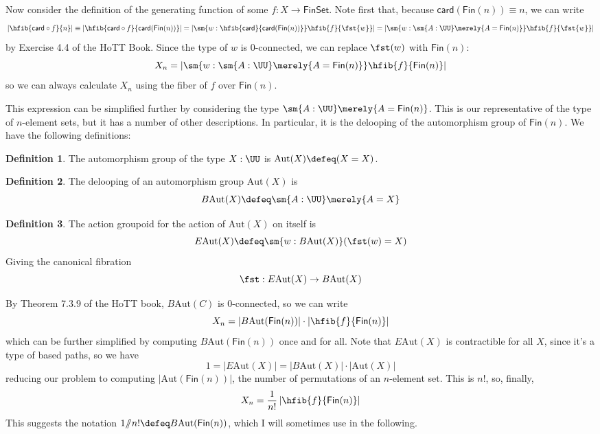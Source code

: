 \documentclass[fleqn]{article}
\newcommand{\card}{\mathsf{card}}
\newcommand{\fin}{\mathsf{Fin}}
\newcommand{\finset}{\mathsf{FinSet}}
\newcommand{\abs}[1]{\left\lvert #1 \right\rvert}
\newcommand{\Aut}{\mathrm{Aut}}
\newcommand{\sslash}{/\!\!/}
\theoremstyle{theorem}
\theoremstyle{definition}
\newtheorem{defn}{Definition}[section]
\begin{document}
Now consider the definition of the generating function of some $f : X \to
\finset$.  Note first that, because $\card(\fin(n)) \equiv n$, we can write
\[
  \abs{\hfib{\card \circ f}{n}}
  \equiv
  \abs{\hfib{\card \circ f}{\card(\fin(n))}}
  =
  \abs{\sm{w : \hfib{\card}{\card(\fin(n))}}\hfib{f}{\fst{w}}}
  =
  \abs{\sm{w : \sm{A : \UU}\merely{A = \fin(n)}}\hfib{f}{\fst{w}}}
\]
by Exercise 4.4 of the \ac{HoTT} Book.  Since the type of $w$ is 0-connected,
we can replace $\fst(w)$ with $\fin(n)$:
\[
  X_{n} =
  \abs{\sm{w : \sm{A : \UU}\merely{A = \fin(n)}}\hfib{f}{\fin(n)}}
\]
so we can always calculate $X_{n}$ using the fiber of $f$ over $\fin(n)$.

This expression can be simplified further by considering the type $\sm{A :
  \UU}\merely{A = \fin(n)}$.  This is our representative of the type of
$n$-element sets, but it has a number of other descriptions.  In particular, it
is the delooping of the automorphism group of $\fin(n)$.  We have the following
definitions:
\begin{defn}
  The automorphism group of the type $X : \UU$ is $\Aut(X) \defeq (X = X)$.
\end{defn}
\begin{defn}
  The delooping of an automorphism group $\Aut(X)$ is
  \[
    B\Aut(X) \defeq \sm{A : \UU} \merely{A = X}
  \]
\end{defn}
\begin{defn}
  The action groupoid for the action of $\Aut(X)$ on itself is
  \[
    E\Aut(X) \defeq \sm{w : B\Aut(X)} (\fst(w) = X)
  \]
  Giving the canonical fibration
  \[
    \fst : E\Aut(X) \to B\Aut(X)
  \]
\end{defn}
By Theorem 7.3.9 of the \ac{HoTT} book, $B\Aut(C)$ is $0$-connected, so we can
write
\[
  X_{n} = \abs{B\Aut(\fin(n))} \cdot \abs{\hfib{f}{\fin(n)}}
\]
which can be further simplified by computing $B\Aut(\fin(n))$ once and for all.
Note that $E\Aut(X)$ is contractible for all $X$, since it's a type of based
paths, so we have
\[
 1
 = \abs{E\Aut(X)}
 = \abs{B\Aut(X)} \cdot \abs{\Aut(X)}
\]
reducing our problem to computing $\abs{\Aut(\fin(n))}$, the number of
permutations of an $n$-element set.  This is $n!$, so, finally,
\[
  X_{n} = \frac{1}{n!} \abs{\hfib{f}{\fin(n)}}
\]
This suggests the notation $1 \sslash n! \defeq B\Aut(\fin(n))$, which I will
sometimes use in the following.
\end{document}
